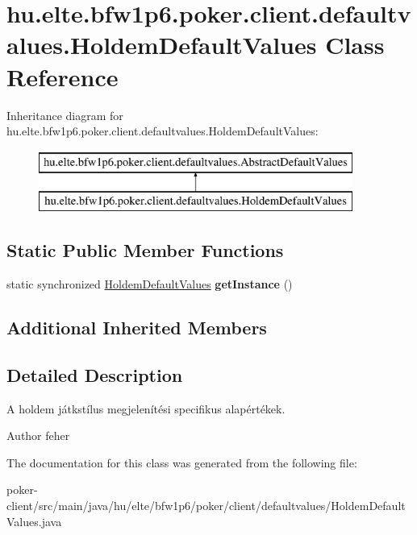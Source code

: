 \hypertarget{classhu_1_1elte_1_1bfw1p6_1_1poker_1_1client_1_1defaultvalues_1_1_holdem_default_values}{}\section{hu.\+elte.\+bfw1p6.\+poker.\+client.\+defaultvalues.\+Holdem\+Default\+Values Class Reference}
\label{classhu_1_1elte_1_1bfw1p6_1_1poker_1_1client_1_1defaultvalues_1_1_holdem_default_values}
Inheritance diagram for hu.\+elte.\+bfw1p6.\+poker.\+client.\+defaultvalues.\+Holdem\+Default\+Values\+:\begin{figure}[H]
\begin{center}
\leavevmode
\includegraphics[height=2.000000cm]{classhu_1_1elte_1_1bfw1p6_1_1poker_1_1client_1_1defaultvalues_1_1_holdem_default_values}
\end{center}
\end{figure}
\subsection*{Static Public Member Functions}
\begin{DoxyCompactItemize}
\item 
\hypertarget{classhu_1_1elte_1_1bfw1p6_1_1poker_1_1client_1_1defaultvalues_1_1_holdem_default_values_a60dd0a1def0f3ec01b712d1419567dc5}{}static synchronized \hyperlink{classhu_1_1elte_1_1bfw1p6_1_1poker_1_1client_1_1defaultvalues_1_1_holdem_default_values}{Holdem\+Default\+Values} {\bfseries get\+Instance} ()\label{classhu_1_1elte_1_1bfw1p6_1_1poker_1_1client_1_1defaultvalues_1_1_holdem_default_values_a60dd0a1def0f3ec01b712d1419567dc5}

\end{DoxyCompactItemize}
\subsection*{Additional Inherited Members}


\subsection{Detailed Description}
A holdem játkstílus megjelenítési specifikus alapértékek. \begin{DoxyAuthor}{Author}
feher 
\end{DoxyAuthor}


The documentation for this class was generated from the following file\+:\begin{DoxyCompactItemize}
\item 
poker-\/client/src/main/java/hu/elte/bfw1p6/poker/client/defaultvalues/Holdem\+Default\+Values.\+java\end{DoxyCompactItemize}
